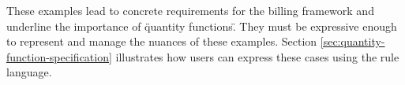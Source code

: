 These examples lead to concrete requirements for the billing framework and underline the importance of \"quantity functions\".
They must be expressive enough to represent and manage the nuances of these examples.
Section \ref{sec:quantity-function-specification} illustrates how users can express these cases using the rule language.


%
%

